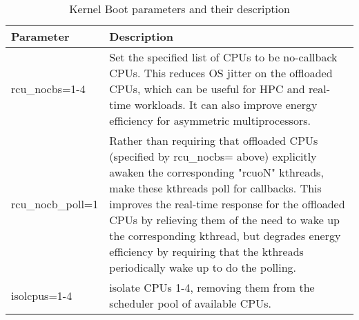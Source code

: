 \begin{table}
    \centering
    \caption{Kernel Boot parameters and their description}
    \label{tab:kernel_params_table}
\begin{tabular}{|l|p{10cm}|}
    \hline
    Parameter & Description \\
    \hline \hline
    rcu\_nocbs=1-4 & Set the specified list of CPUs to be no-callback CPUs.  This reduces OS jitter on the   offloaded CPUs, which can be useful for HPC and real-time workloads.  It can also improve energy efficiency for asymmetric multiprocessors. \\ 
    \hline
    rcu\_nocb\_poll=1 & Rather than requiring that offloaded CPUs (specified by rcu\_nocbs= above) explicitly awaken the corresponding "rcuoN" kthreads, make these kthreads poll for callbacks. This improves the real-time response for the offloaded CPUs by relieving them of the need to wake up the corresponding kthread, but degrades energy efficiency by requiring that the kthreads periodically wake up to do the polling. \\
    \hline
    isolcpus=1-4 & isolate CPUs 1-4, removing them from the scheduler pool of available CPUs. \\ 
    \hline
\end{tabular}
\end{table}
